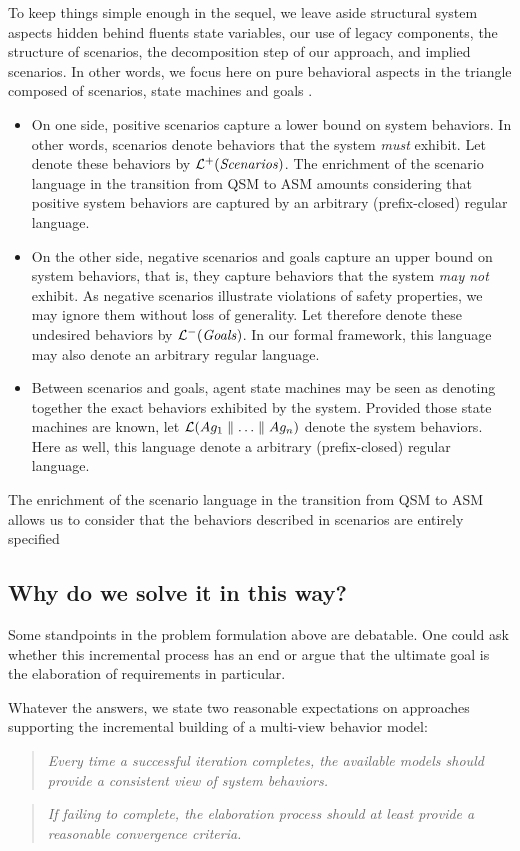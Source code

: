 To keep things simple enough in the sequel, we leave aside structural system aspects hidden behind fluents state variables, our use of legacy components, the structure of scenarios, the decomposition step of our approach, and implied scenarios. In other words, we focus here on pure behavioral aspects in the triangle composed of scenarios, state machines and goals \cite{Damas:2006, Uchitel:2007}.
\begin{itemize}
\item On one side, positive scenarios capture a lower bound on system behaviors. In other words, scenarios denote behaviors that the system \emph{must} exhibit. Let denote these behaviors by $\mathcal{L}^+(\mbox{\emph{Scenarios}})$. The enrichment of the scenario language in the transition from QSM to ASM amounts considering that positive system behaviors are captured by an arbitrary (prefix-closed) regular language.
\item On the other side, negative scenarios and goals capture an upper bound on system behaviors, that is, they capture behaviors that the system \emph{may not} exhibit. As negative scenarios illustrate violations of safety properties, we may ignore them without loss of generality. Let therefore denote these undesired behaviors by $\mathcal{L}^-(\mbox{\emph{Goals}})$. In our formal framework, this language may also denote an arbitrary regular language.
\item Between scenarios and goals, agent state machines may be seen as denoting together the exact behaviors exhibited by the system. Provided those state machines are known, let $\mathcal{L}(Ag_1 \parallel \ldots \parallel Ag_n)$ denote the system behaviors. Here as well, this language denote a arbitrary (prefix-closed) regular language.
\end{itemize}

The enrichment of the scenario language in the transition from QSM to ASM allows us to consider that the behaviors described in scenarios are entirely specified 

\subsection{Why do we solve it in this way?}

Some standpoints in the problem formulation above are debatable. One could ask whether this incremental process has an end or argue that the ultimate goal is the elaboration of requirements in particular. 

Whatever the answers, we state two reasonable expectations on approaches supporting the incremental building of a multi-view behavior model:
\begin{quotation}
\emph{Every time a successful iteration completes, the available models should provide a consistent view of system behaviors.}
\end{quotation}
\begin{quotation}
\emph{If failing to complete, the elaboration process should at least provide a reasonable convergence criteria.}
\end{quotation}

